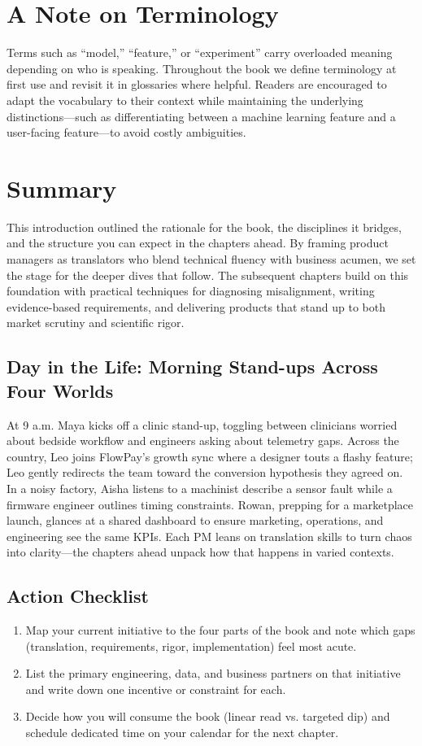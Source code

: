 \section{A Note on Terminology}
\label{sec:terminology}

Terms such as ``model,'' ``feature,'' or ``experiment'' carry overloaded meaning depending on who is speaking. Throughout the book we define terminology at first use and revisit it in glossaries where helpful. Readers are encouraged to adapt the vocabulary to their context while maintaining the underlying distinctions—such as differentiating between a machine learning feature and a user-facing feature—to avoid costly ambiguities.

\section{Summary}
\label{sec:intro-summary}

This introduction outlined the rationale for the book, the disciplines it bridges, and the structure you can expect in the chapters ahead. By framing product managers as translators who blend technical fluency with business acumen, we set the stage for the deeper dives that follow. The subsequent chapters build on this foundation with practical techniques for diagnosing misalignment, writing evidence-based requirements, and delivering products that stand up to both market scrutiny and scientific rigor.

\subsection{Day in the Life: Morning Stand-ups Across Four Worlds}
At 9 a.m. Maya kicks off a clinic stand-up, toggling between clinicians worried about bedside workflow and engineers asking about telemetry gaps. Across the country, Leo joins FlowPay’s growth sync where a designer touts a flashy feature; Leo gently redirects the team toward the conversion hypothesis they agreed on. In a noisy factory, Aisha listens to a machinist describe a sensor fault while a firmware engineer outlines timing constraints. Rowan, prepping for a marketplace launch, glances at a shared dashboard to ensure marketing, operations, and engineering see the same KPIs. Each PM leans on translation skills to turn chaos into clarity—the chapters ahead unpack how that happens in varied contexts.
\subsection{Action Checklist}
\begin{enumerate}
    \item Map your current initiative to the four parts of the book and note which gaps (translation, requirements, rigor, implementation) feel most acute.
    \item List the primary engineering, data, and business partners on that initiative and write down one incentive or constraint for each.
    \item Decide how you will consume the book (linear read vs. targeted dip) and schedule dedicated time on your calendar for the next chapter.
\end{enumerate}

